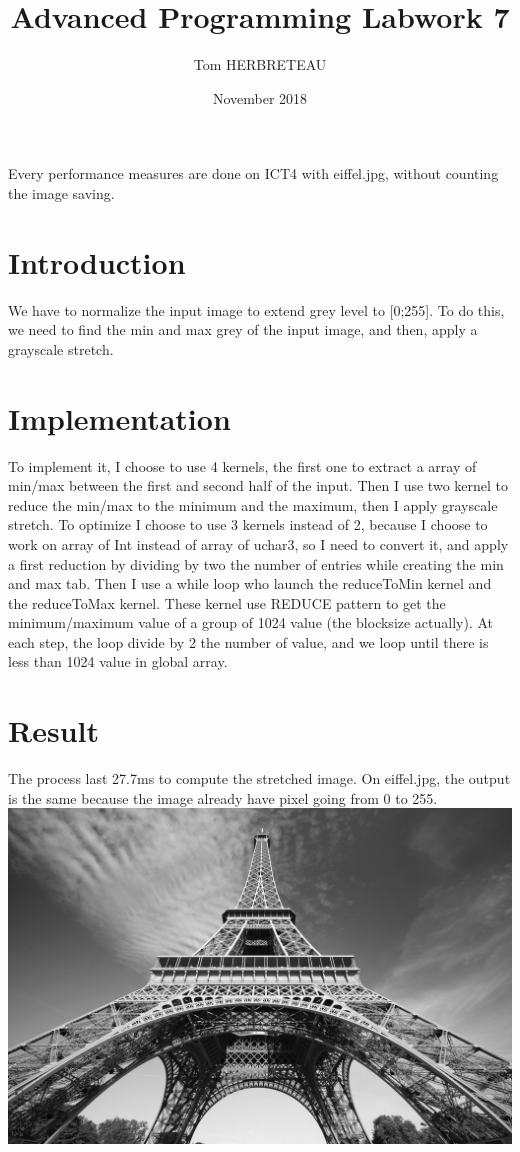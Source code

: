 \documentclass{article}
\title{Advanced Programming Labwork 7}
\author{Tom HERBRETEAU }
\date{November 2018}
\begin{document}
\maketitle
Every performance measures are done on ICT4 with eiffel.jpg, without counting the image saving.
\section{Introduction}
We have to normalize the input image to extend grey level to [0;255]. To do this, we need to find the min and max grey of the input image, and then, apply a grayscale stretch.
\section{Implementation}
To implement it, I choose to use 4 kernels, the first one to extract a array of min/max between the first and second half of the input. Then I use two kernel to reduce the min/max to the minimum and the maximum, then I apply grayscale stretch.
To optimize I choose to use 3 kernels instead of 2, because I choose to work on array of Int instead of array of uchar3, so I need to convert it, and apply a first reduction by dividing by two the number of entries while creating the min and max tab.
Then I use a while loop who launch the reduceToMin kernel and the reduceToMax kernel. These kernel use REDUCE pattern to get the minimum/maximum value of a group of 1024 value (the blocksize actually). At each step, the loop divide by 2 the number of value, and we loop until there is less than 1024 value in global array.

\section{Result}
The process last 27.7ms to compute the stretched image. On eiffel.jpg, the output is the same because the image already have pixel going from 0 to 255.
\newline
\includegraphics[width=\textwidth]{labwork7-gpu-out.jpg}

\end{document}
